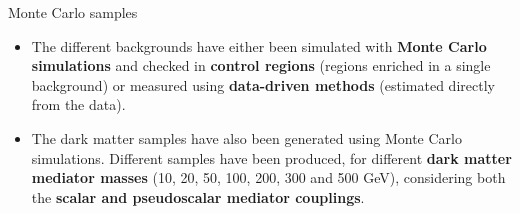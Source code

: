 \documentclass[8 pt]{beamer}
\begin{document}
\begin{frame}{Monte Carlo samples}
	
	\begin{itemize}
	\justifying
	\item The different backgrounds have either been simulated with \textbf{Monte Carlo simulations} and checked in \textbf{control regions} (regions enriched in a single background) or measured using \textbf{data-driven methods} (estimated directly from the data). \\ \vspace{8pt} 
	\item The dark matter samples have also been generated using Monte Carlo simulations. Different samples have been produced, for different \textbf{dark matter mediator masses} (10, 20, 50, 100, 200, 300 and 500 GeV), considering both the \textbf{scalar and pseudoscalar mediator couplings}.
	\end{itemize} \vfill 


\end{frame}
\end{document}
